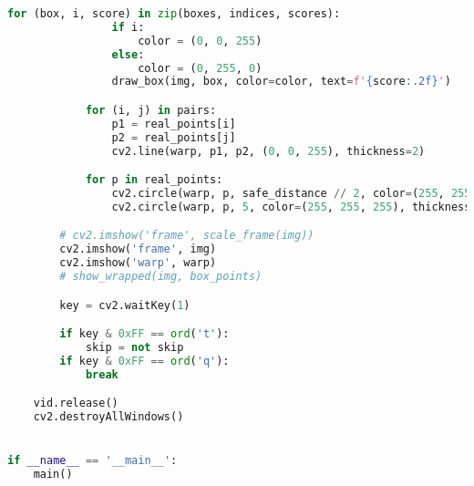 \begin{lstlisting}[language=Python]
            for (box, i, score) in zip(boxes, indices, scores):
                if i:
                    color = (0, 0, 255)
                else:
                    color = (0, 255, 0)
                draw_box(img, box, color=color, text=f'{score:.2f}')

            for (i, j) in pairs:
                p1 = real_points[i]
                p2 = real_points[j]
                cv2.line(warp, p1, p2, (0, 0, 255), thickness=2)

            for p in real_points:
                cv2.circle(warp, p, safe_distance // 2, color=(255, 255, 255), thickness=2)
                cv2.circle(warp, p, 5, color=(255, 255, 255), thickness=-1)

        # cv2.imshow('frame', scale_frame(img))
        cv2.imshow('frame', img)
        cv2.imshow('warp', warp)
        # show_wrapped(img, box_points)

        key = cv2.waitKey(1)

        if key & 0xFF == ord('t'):
            skip = not skip
        if key & 0xFF == ord('q'):
            break

    vid.release()
    cv2.destroyAllWindows()


if __name__ == '__main__':
    main()

\end{lstlisting}
